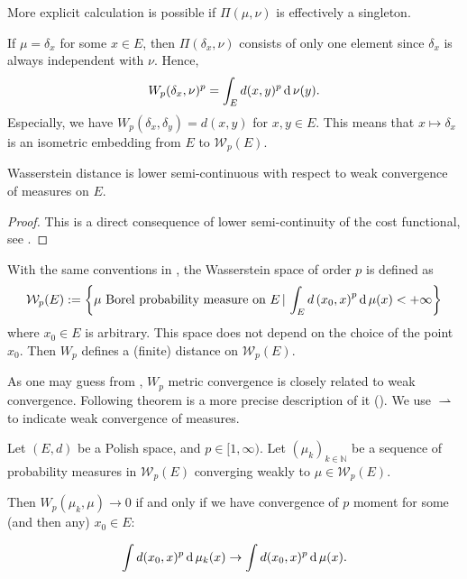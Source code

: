 More explicit calculation is possible if $\Pi(\mu,\nu)$ is effectively a singleton.
\begin{example}
	\label{example:delta_measure_Wasserstein_distance}
	If $\mu=\delta_x$ for some $x \in E$,
	then $\Pi(\delta_x, \nu)$ consists of only one element since $\delta_x$ is always independent with $\nu$.
	Hence,
	\[
		W_p(\delta_x, \nu)^p = \int_{E} d(x, y)^p \operatorname{d} \nu(y).
	\]
	Especially, we have $W_p(\delta_x, \delta_y) = d(x,y)$ for $x,y \in E$.
	This means that $x \mapsto \delta_x$ is an isometric embedding from $E$ to $\mathcal{W}_p(E)$.
\end{example}

\begin{lem}
	\label{lem:lower_semicontinous_Wasserstein_distance}
	Wasserstein distance is lower semi-continuous with respect to weak convergence of measures on $E$.
\end{lem}

\begin{proof}
	This is a direct consequence of lower semi-continuity of the cost functional,
	see .
\end{proof}

\begin{defn}
	\label{Wasserstein_space}
	With the same conventions in , the Wasserstein space of order \( p \) is defined as
	\[
		\mathcal{W}_p(E): = \left\{ \mu \text{ Borel  probability measure on } E \,|
		\, \int _ { E } d \left( x _ { 0 } , x \right) ^ { p } \operatorname{d} \mu (x) < + \infty \right\}
	\]
	where \( x _ { 0 } \in E \) is arbitrary. This space does not depend on the choice of the point \( x _ { 0 } \). Then \( W _ { p } \) defines a (finite) distance on \( \mathcal{W}_p(E) \).
\end{defn}

As one may guess from ,
$W_p$ metric convergence is closely related to weak convergence.
Following theorem is a more precise description of it (\cite[Theorem 6.9]{villani2008optimal}).
We use $\rightharpoonup$ to indicate weak convergence of measures.

\begin{thm}
	\label{thm:Wp_metricizes_weak_convergence}
	Let \( ( E , d ) \) be a Polish space, and \( p \in [ 1 , \infty ) \).
	Let \( \left( \mu _ { k } \right) _ { k \in \mathbb{ N } } \) be a
	sequence of probability measures in \( \mathcal{W}_p ( E ) \)
	converging weakly to \( \mu \in \mathcal{W}_p(E)	\).

	Then \( W_p \left( \mu _ { k }, \mu \right) \rightarrow 0 \)
	if and only if we have convergence of $p$ moment for
	some (and then any) \( x _ { 0 } \in E\):

	\[
		\int d ( x _ { 0 } , x ) ^ { p } \operatorname{d} \mu _ { k } ( x ) \rightarrow \int d ( x _ { 0 } , x ) ^ { p } \operatorname{d} \mu ( x ).
	\]

\end{thm}

